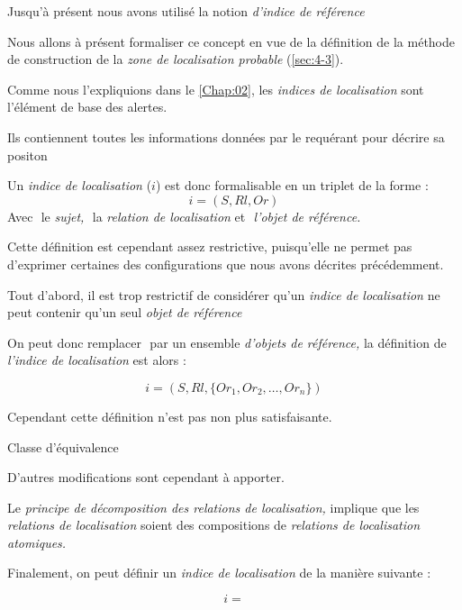 
Jusqu'à présent nous avons utilisé la notion \emph{d'indice de
  référence}

Nous allons à présent formaliser ce concept en vue de la définition de
la méthode de construction de la \emph{zone de localisation probable}
(\autoref{sec:4-3}).

Comme nous l'expliquions dans le \autoref{Chap:02}, les \emph{indices
  de localisation} sont l'élément de base des alertes.

Ils contiennent toutes les informations données par le requérant pour
décrire sa positon

Un \emph{indice de localisation} (\(i\)) est donc formalisable en un
triplet de la forme :
%
\begin{equation}
  i = (S, Rl, Or)
\end{equation}
%
Avec \(\) le \emph{sujet,} \(\) la \emph{relation de localisation} et
\(\) \emph{l'objet de référence.}

Cette définition est cependant assez restrictive, puisqu'elle ne
permet pas d'exprimer certaines des configurations que nous avons
décrites précédemment.                                                                                                                                             

Tout d'abord, il est trop restrictif de considérer qu'un \emph{indice
  de localisation} ne peut contenir qu'un seul \emph{objet de
  référence}

On peut donc remplacer \(\) par un ensemble \emph{d'objets de
  référence,} la définition de \emph{l'indice de localisation} est
alors :

\begin{equation}
  i = (S, Rl, \{Or_1, Or_2, \ldots, Or_n\})
\end{equation}

Cependant cette définition n'est pas non plus satisfaisante.

Classe d'équivalence


D'autres modifications sont cependant à apporter.

Le \emph{principe de décomposition des relations de localisation,}
implique que les \emph{relations de localisation} soient des
compositions de \emph{relations de localisation atomiques.}



Finalement, on peut définir un \emph{indice de localisation} de la
manière suivante :

\begin{equation}
  i =
\end{equation}

